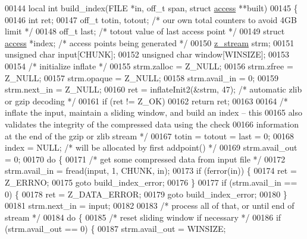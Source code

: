 \begin{DoxyCode}
00144 local \textcolor{keywordtype}{int} build\_index(FILE *in, off\_t span, \textcolor{keyword}{struct} \hyperlink{structaccess}{access} **built)
00145 \{
00146     \textcolor{keywordtype}{int} ret;
00147     off\_t totin, totout;        \textcolor{comment}{/* our own total counters to avoid 4GB limit */}
00148     off\_t last;                 \textcolor{comment}{/* totout value of last access point */}
00149     \textcolor{keyword}{struct }\hyperlink{structaccess}{access} *index;       \textcolor{comment}{/* access points being generated */}
00150     \hyperlink{structz__stream__s}{z\_stream} strm;
00151     \textcolor{keywordtype}{unsigned} \textcolor{keywordtype}{char} input[CHUNK];
00152     \textcolor{keywordtype}{unsigned} \textcolor{keywordtype}{char} window[WINSIZE];
00153 
00154     \textcolor{comment}{/* initialize inflate */}
00155     strm.zalloc = Z\_NULL;
00156     strm.zfree = Z\_NULL;
00157     strm.opaque = Z\_NULL;
00158     strm.avail\_in = 0;
00159     strm.next\_in = Z\_NULL;
00160     ret = inflateInit2(&strm, 47);      \textcolor{comment}{/* automatic zlib or gzip decoding */}
00161     \textcolor{keywordflow}{if} (ret != Z\_OK)
00162         \textcolor{keywordflow}{return} ret;
00163 
00164     \textcolor{comment}{/* inflate the input, maintain a sliding window, and build an index -- this}
00165 \textcolor{comment}{       also validates the integrity of the compressed data using the check}
00166 \textcolor{comment}{       information at the end of the gzip or zlib stream */}
00167     totin = totout = last = 0;
00168     index = NULL;               \textcolor{comment}{/* will be allocated by first addpoint() */}
00169     strm.avail\_out = 0;
00170     \textcolor{keywordflow}{do} \{
00171         \textcolor{comment}{/* get some compressed data from input file */}
00172         strm.avail\_in = fread(input, 1, CHUNK, in);
00173         \textcolor{keywordflow}{if} (ferror(in)) \{
00174             ret = Z\_ERRNO;
00175             \textcolor{keywordflow}{goto} build\_index\_error;
00176         \}
00177         \textcolor{keywordflow}{if} (strm.avail\_in == 0) \{
00178             ret = Z\_DATA\_ERROR;
00179             \textcolor{keywordflow}{goto} build\_index\_error;
00180         \}
00181         strm.next\_in = input;
00182 
00183         \textcolor{comment}{/* process all of that, or until end of stream */}
00184         \textcolor{keywordflow}{do} \{
00185             \textcolor{comment}{/* reset sliding window if necessary */}
00186             \textcolor{keywordflow}{if} (strm.avail\_out == 0) \{
00187                 strm.avail\_out = WINSIZE;

\end{DoxyCode}
